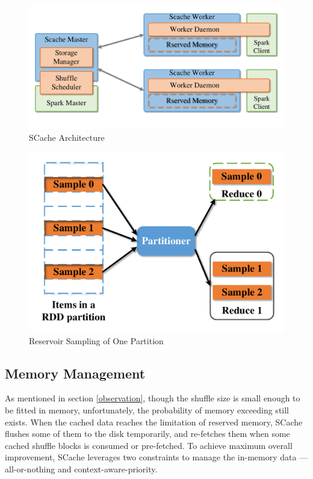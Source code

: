 \begin{figure}
	\centering
	\includegraphics[width=0.9\linewidth]{fig/arch}
	\caption{SCache Architecture}
	\label{fig:arch}
\end{figure}
\begin{figure}
	\centering
	\includegraphics[width=0.7\linewidth]{fig/sample}
	\caption{Reservoir Sampling of One Partition}
	\label{fig:sample}
\end{figure}

\subsection{Memory Management}\label{memorymanage}
As mentioned in section \ref{observation}, though the shuffle size is small enough to be fitted in memory, unfortunately, the probability of memory exceeding still exists.
When the cached data reaches the limitation of reserved memory, SCache flushes some of them to the disk temporarily, and re-fetches them when some cached shuffle blocks is consumed or pre-fetched. To achieve maximum overall improvement, SCache leverages two constraints to manage the in-memory data --- all-or-nothing and context-aware-priority.

